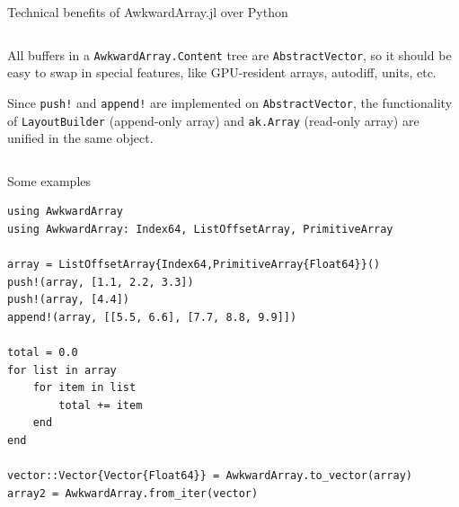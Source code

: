 \documentclass[aspectratio=169]{beamer}
\begin{document}
\begin{frame}{Technical benefits of AwkwardArray.jl over Python}
\large
\vspace{0.3 cm}
\begin{columns}

\begin{description}\setlength{\itemsep}{0.5 cm}
\item<1->[\bf Composability:] All buffers in a \texttt{AwkwardArray.Content} tree are \texttt{AbstractVector}, so it should be easy to swap in special features, like GPU-resident arrays, autodiff, units, etc.

\vspace{0.25 cm}

\item<3->[\bf Unification:] Since \texttt{push!} and \texttt{append!} are implemented on \texttt{AbstractVector}, the functionality of \texttt{LayoutBuilder} (append-only array) and \texttt{ak.Array} (read-only array) are unified in the same object.

\vspace{0.25 cm}
\end{description}
\end{columns}
\end{frame}

\begin{frame}[fragile]{Some examples}
\small
\vspace{0.25 cm}
\begin{verbatim}
using AwkwardArray
using AwkwardArray: Index64, ListOffsetArray, PrimitiveArray

array = ListOffsetArray{Index64,PrimitiveArray{Float64}}()
push!(array, [1.1, 2.2, 3.3])
push!(array, [4.4])
append!(array, [[5.5, 6.6], [7.7, 8.8, 9.9]])

total = 0.0
for list in array
    for item in list
        total += item
    end
end

vector::Vector{Vector{Float64}} = AwkwardArray.to_vector(array)
array2 = AwkwardArray.from_iter(vector)
\end{verbatim}
\end{frame}
\end{document}

